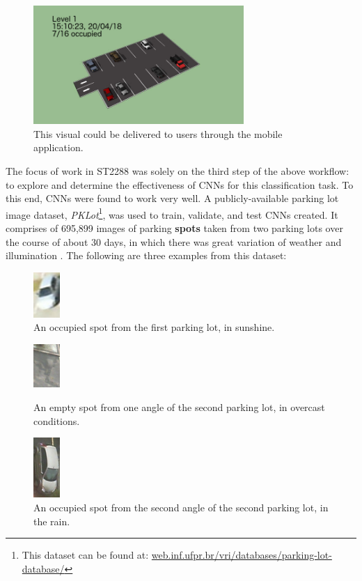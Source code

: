 \documentclass[a4paper, 11pt]{article} %
\begin{document}
	\begin{figure}[H]
		\centering
		\includegraphics[width=8cm]{figures/mock-up.jpg}
		\caption{This visual could be delivered to users through the mobile application.}
	\end{figure}
	The focus of work in ST2288 was solely on the third step of 
	the above workflow: to 
	explore and determine the effectiveness of CNNs for this classification task. To this end, CNNs were 
	found to work very well. A publicly-available parking lot image dataset, 
	\textit{PKLot}\footnote{This dataset can be found at: 
		\hyperlink{https://web.inf.ufpr.br/vri/databases/parking-lot-database/}
		{web.inf.ufpr.br/vri/databases/parking-lot-database/}}, was used to 
	train, validate, and test CNNs created. It comprises of 695,899 images of 
	parking \textbf{spots} taken from two parking lots over the course of about 
	30 days, in which there was 
	great variation of weather and illumination \cite{pklot-paper}\relax. The 
	following are three examples from this dataset:
	\vskip 5mm
	\begin{figure}[H]
		\centering
		\includegraphics[width=1cm]{figures/pklot_example_1.jpg}
		\caption{An occupied spot from the first parking lot, in sunshine.}
	\end{figure}
	\begin{figure}[H]
		\centering
		\includegraphics[width=1cm]{figures/pklot_example_2.jpg}
		\caption{An empty spot from one angle of the second parking lot, in overcast conditions.}
		\vspace{5mm}
		\includegraphics[width=1cm]{figures/pklot_example_3.jpg}
		\caption{An occupied spot from the second angle of the second parking 
		lot, in the rain.}
	\end{figure}
\end{document}
